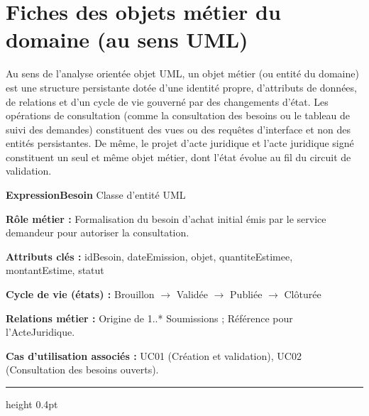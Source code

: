 \documentclass[11pt,a4paper]{article}
\begin{document}
\newpage
\section{Fiches des objets métier du domaine (au sens UML)}

Au sens de l'analyse orientée objet UML, un objet métier (ou entité du domaine) est une structure persistante dotée d'une identité propre, d'attributs de données, de relations et d'un cycle de vie gouverné par des changements d'état. Les opérations de consultation (comme la consultation des besoins ou le tableau de suivi des demandes) constituent des vues ou des requêtes d'interface et non des entités persistantes. De même, le projet d'acte juridique et l'acte juridique signé constituent un seul et même objet métier, dont l'état évolue au fil du circuit de validation.

\vspace{0.2cm}

\newcommand{\ficheobjet}[6]{
  \par\vspace{0.10cm}
  \noindent\begin{minipage}{\linewidth}
  \textbf{\sffamily\normalsize\color{BleuInstitutionnel}#1} \hfill {\footnotesize\sffamily\color{GrisFonce} Classe d'entité UML}\par
  \vspace{0.03cm}
  \textbf{Rôle métier :} #2\par
  \textbf{Attributs clés :} {\small\textsf{#3}}\par
  \textbf{Cycle de vie (états) :} #4\par
  \textbf{Relations métier :} #5\par
  \textbf{Cas d'utilisation associés :} #6\par
  \vspace{0.06cm}\hrule height 0.4pt \color{gray!25}\par
  \end{minipage}\par
}

\ficheobjet{ExpressionBesoin}
{Formalisation du besoin d'achat initial émis par le service demandeur pour autoriser la consultation.}
{idBesoin, dateEmission, objet, quantiteEstimee, montantEstime, statut}
{Brouillon $\rightarrow$ Validée $\rightarrow$ Publiée $\rightarrow$ Clôturée}
{Origine de 1..* Soumissions ; Référence pour l'ActeJuridique.}
{UC01 (Création et validation), UC02 (Consultation des besoins ouverts).}
\end{document}
